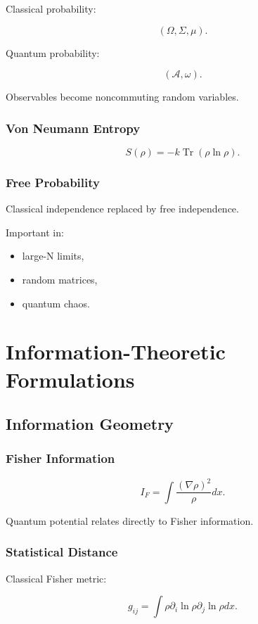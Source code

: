 \documentclass[11pt]{book}
\begin{document}
Classical probability:

\[
(\Omega,\Sigma,\mu).
\]

Quantum probability:

\[
(\mathcal A,\omega).
\]

Observables become noncommuting random variables.

\section{Von Neumann Entropy}

\[
S(\rho)
=
-k\operatorname{Tr}(\rho\ln\rho).
\]

\section{Free Probability}

Classical independence replaced by free independence.

Important in:

\begin{itemize}
\item large-N limits,
\item random matrices,
\item quantum chaos.
\end{itemize}

\part{Information-Theoretic Formulations}

\chapter{Information Geometry}

\section{Fisher Information}

\[
I_F
=
\int
\frac{(\nabla\rho)^2}{\rho}
 dx.
\]

Quantum potential relates directly to Fisher information.

\section{Statistical Distance}

Classical Fisher metric:

\[
g_{ij}
=
\int
\rho
\partial_i\ln\rho
\partial_j\ln\rho
 dx.
\]
\end{document}
